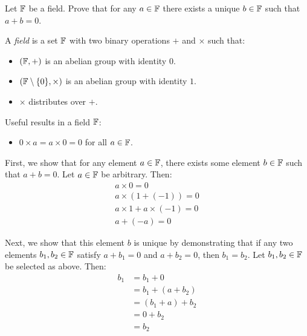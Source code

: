 \begin{problem}
  Let $\mathbb{F}$ be a field.
  Prove that for any $a \in \mathbb{F}$ there exists a unique $b \in \mathbb{F}$
  such that $a + b = 0$.
\end{problem}

\begin{answer}
  \begin{definition}
    A \emph{field} is a set $\mathbb{F}$ with two binary operations $+$ and $\times$
    such that:
    \begin{itemize}
      \item $(\mathbb{F}, +)$ is an abelian group with identity $0$.
      \item $(\mathbb{F} \setminus \{0\}, \times)$ is an abelian group with identity $1$.
      \item $\times$ distributes over $+$.
    \end{itemize}
  \end{definition}

  \step
  Useful results in a field $\mathbb{F}$:
  \begin{itemize}
    \item $0 \times a = a \times 0 = 0$ for all $a \in \mathbb{F}$.
  \end{itemize}

  \begin{enumroman}
    \item First, we show that for any element $a \in \mathbb{F}$, there exists some element $b \in \mathbb{F}$
      such that $a + b = 0$. Let $a \in \mathbb{F}$ be arbitrary. Then:
      \begin{align*}
        a \times 0 = 0 \\
        a \times (1 + (-1)) = 0 \\
        a \times 1 + a \times (-1) = 0 \\
        a + (-a) = 0
      \end{align*}

    \item Next, we show that this element $b$ is unique by demonstrating
      that if any two elements $b_1, b_2 \in \mathbb{F}$ satisfy $a + b_1 = 0$
      and $a + b_2 = 0$, then $b_1 = b_2$.
      Let $b_1, b_2 \in \mathbb{F}$ be selected as above.
      Then:
      \begin{align*}
        b_1 &= b_1 + 0 \\
            &= b_1 + (a + b_2) \\
            &= (b_1 + a) + b_2 \\
            &= 0 + b_2 \\
            &= b_2
      \end{align*}
  \end{enumroman}
\end{answer}
